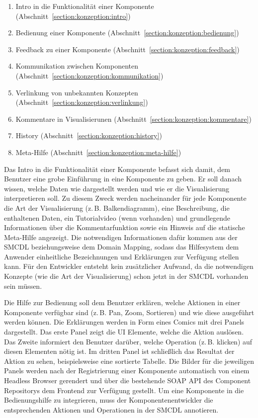 \documentclass[
	headsepline,
	footsepline,
	fontsize=12pt,
	bibliography=totoc
]{scrbook}
\begin{document}
\begin{enumerate}
	\item Intro in die Funktionalität einer Komponente (Abschnitt~\ref{section:konzeption:intro})
	\item Bedienung einer Komponente (Abschnitt~\ref{section:konzeption:bedienung})
	\item Feedback zu einer Komponente (Abschnitt~\ref{section:konzeption:feedback})
	\item Kommunikation zwischen Komponenten (Abschnitt~\ref{section:konzeption:kommunikation})
	\item Verlinkung von unbekannten Konzepten (Abschnitt~\ref{section:konzeption:verlinkung})
	\item Kommentare in Visualisierunen (Abschnitt~\ref{section:konzeption:kommentare})
	\item History (Abschnitt~\ref{section:konzeption:history})
	\item Meta-Hilfe (Abschnitt~\ref{section:konzeption:meta-hilfe})
\end{enumerate}


Das Intro in die Funktionalität einer Komponente befasst sich damit, dem Benutzer eine grobe Einführung in eine Komponente zu geben. Er soll danach wissen, welche Daten wie dargestellt werden und wie er die Visualisierung interpretieren soll. Zu diesem Zweck werden nacheinander für jede Komponente die Art der Visualisierung (z.\,B. Balkendiagramm), eine Beschreibung, die enthaltenen Daten, ein Tutorialvideo (wenn vorhanden) und grundlegende Informationen über die Kommentarfunktion sowie ein Hinweis auf die statische Meta-Hilfe angezeigt. Die notwendigen Informationen dafür kommen aus der SMCDL beziehungsweise dem Domain Mapping, sodass das Hilfesystem dem Anwender einheitliche Bezeichnungen und Erklärungen zur Verfügung stellen kann. Für den Entwickler entsteht kein zusätzlicher Aufwand, da die notwendigen Konzepte (wie die Art der Visualisierung) schon jetzt in der SMCDL vorhanden sein müssen.


Die Hilfe zur Bedienung soll dem Benutzer erklären, welche Aktionen in einer Komponente verfügbar sind (z.\,B. Pan, Zoom, Sortieren) und wie diese ausgeführt werden können. Die Erklärungen werden in Form eines Comics mit drei Panels dargestellt. Das erste Panel zeigt die UI Elemente, welche die Aktion auslösen. Das Zweite informiert den Benutzer darüber, welche Operation (z.\,B. klicken) auf diesen Elementen nötig ist. Im dritten Panel ist schließlich das Resultat der Aktion zu sehen, beispielsweise eine sortierte Tabelle. Die Bilder für die jeweiligen Panels werden nach der Registrierung einer Komponente automatisch von einem Headless Browser gerendert und über die bestehende SOAP API des Component Repositorys dem Frontend zur Verfügung gestellt. Um eine Komponente in die Bedienungshilfe zu integrieren, muss der Komponentenentwickler die entsprechenden Aktionen und Operationen in der SMCDL annotieren.
\end{document}
